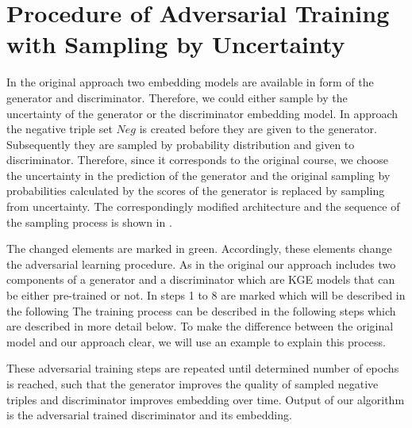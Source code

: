 \section{Procedure of Adversarial Training with Sampling by Uncertainty}
\label{sec:procedure}

In the original \kbgan approach two embedding models are available in form of the generator and discriminator.
Therefore, we could either sample by the uncertainty of the generator or the discriminator embedding model.
In \kbgan approach the negative triple set $Neg$ is created before they are given to the generator.
Subsequently they are sampled by probability distribution and given to discriminator.
Therefore, since it corresponds to the original course, we choose the uncertainty in the prediction of the generator and the original sampling by probabilities calculated by the scores of the generator is replaced by sampling from uncertainty.
The correspondingly modified architecture and the sequence of the sampling process is shown in .

The changed elements are marked in green.
Accordingly, these elements change the adversarial learning procedure.
As in the original \kbgan our approach includes two components of a generator and a discriminator which are \ac{KGE} models that can be either pre-trained or not.
In  steps 1 to 8 are marked which will be described in the following 
The training process can be described in the following steps
which are described in more detail below.
To make the difference between the original model and our approach clear, we will use an example to explain this process.

















These adversarial training steps are repeated until determined number of epochs is reached, such that the generator improves the quality of sampled negative triples and discriminator improves embedding over time.
Output of our algorithm is the adversarial trained discriminator and its embedding.



